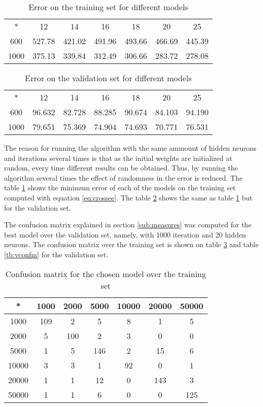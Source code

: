 \documentclass{article}
\begin{document}
\begin{table}
\centering
\begin{tabular}{|c|c|c|c|c|c|c|}
\hline
* & 12 & 14 & 16 & 18 & 20 & 25 \\
600 & 527.78 & 421.02 & 491.96 & 493.66 & 466.69 & 445.39 \\
1000 & 375.13 & 339.84 & 312.49 & 306.66 & 283.72 & 278.08 \\ 
\hline
\end{tabular}
\caption{Error on the training set for different models}
\label{tb:terror}
\end{table}

\begin{table}
\centering
\begin{tabular}{|c|c|c|c|c|c|c|}
\hline
* & 12 & 14 & 16 & 18 & 20 & 25 \\
600 & 96.632 & 82.728 & 88.285 & 90.674 & 84.103 & 94.190 \\
1000 & 79.651 & 75.369 & 74.904 & 74.693 & 70.771 & 76.531 \\ 
\hline
\end{tabular}
\caption{Error on the validation set for different models}
\label{tb:verror}
\end{table}

The reason for running the algorithm with the same ammount of hidden neurons and iterations several times is
that as the initial weights are initialized at random, every time different results can be obtained. Thus,
by running the algorithm several times the effect of randomness in the error is reduced. The table
\ref{tb:terror} shows the minimum error of each of the models on the training set computed with equation \ref{eq:crossee}.
The table \ref{tb:verror} shows the same as table \ref{tb:terror} but for the validation set.


The confusion matrix explained in section \ref{sub:measures} was computed for the best model over the validation
set, namely, with 1000 iteration and 20 hidden neurons. The confusion matrix over the training set is shown on table
\ref{tb:tconfm} and table \ref{tb:vconfm} for the validation set.

\begin{table}
\centering
\begin{tabular}{|c|c|c|c|c|c|c|}
\hline
* & 1000 & 2000 & 5000 & 10000 & 20000 & 50000 \\
\hline
1000 &  109 & 2 & 5 & 8 & 1 & 5 \\
2000 & 5 & 100 & 2 & 3 & 0 & 0 \\
5000 & 1 & 5 & 146 & 2 &  15 & 6 \\
10000 & 3 & 3 & 1 &  92 & 0 & 1 \\
20000 & 1 & 1 &  12 & 0 & 143 & 3 \\
50000 & 1 & 1 & 6 & 0 & 0 & 125 \\
\hline
\end{tabular}
\caption{Confusion matrix for the chosen model over the training set}
\label{tb:tconfm}
\end{table}
\end{document}
